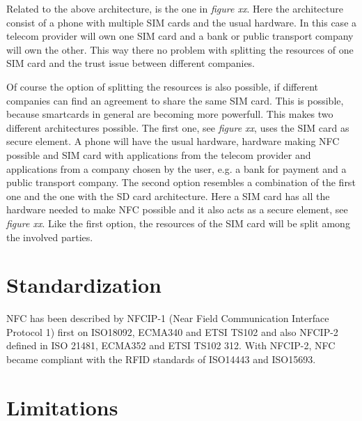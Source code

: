 
Related to the above architecture, is the one in \textit{figure xx}. Here the architecture consist of a phone with multiple SIM cards and the usual hardware. In this case a telecom provider will own one SIM card and a bank or public transport company will own the other. This way there no problem with splitting the resources of one SIM card and the trust issue between different companies.


Of course the option of splitting the resources is also possible, if different companies can find an agreement to share the same SIM card. This is possible, because smartcards in general are becoming more powerfull. This makes two different architectures possible. The first one, see \textit{figure xx}, uses the SIM card as secure element. A phone will have the usual hardware, hardware making NFC possible and SIM card with applications from the telecom provider and applications from a company chosen by the user, e.g. a bank for payment and a public transport company. 
The second option resembles a combination of the first one and the one with the SD card architecture. Here a SIM card has all the hardware needed to make NFC possible and it also acts as a secure element, see \textit{figure xx}. Like the first option, the resources of the SIM card will be split among the involved parties.






\section{Standardization}
NFC has been described by NFCIP-1 (Near Field Communication Interface Protocol 1) first on ISO18092, ECMA340 and ETSI TS102 and also NFCIP-2 defined in ISO 21481, ECMA352 and ETSI TS102 312.
With NFCIP-2, NFC became compliant with the RFID standards of ISO14443 and ISO15693.

\section{Limitations}

